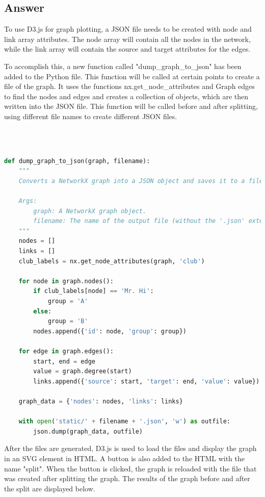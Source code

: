 \documentclass[12pt]{article}
\begin{document}
\subsection*{Answer}
To use D3.js for graph plotting, a JSON file needs to be created with node and link array attributes. The node array will contain all the nodes in the network, while the link array will contain the source and target attributes for the edges.

To accomplish this, a new function called "dump\_graph\_to\_json" has been added to the Python file. This function will be called at certain points to create a file of the graph. It uses the functions nx.get\_node\_attributes and Graph edges to find the nodes and edges and creates a collection of objects, which are then written into the JSON file. This function will be called before and after splitting, using different file names to create different JSON files.

\\

\begin{lstlisting}[language=Python, caption=A function that generates a JSON representation of the graph.]

def dump_graph_to_json(graph, filename):
    """
    Converts a NetworkX graph into a JSON object and saves it to a file.

    Args:
        graph: A NetworkX graph object.
        filename: The name of the output file (without the '.json' extension).
    """
    nodes = []
    links = []
    club_labels = nx.get_node_attributes(graph, 'club')

    for node in graph.nodes():
        if club_labels[node] == 'Mr. Hi':
            group = 'A'
        else:
            group = 'B'
        nodes.append({'id': node, 'group': group})

    for edge in graph.edges():
        start, end = edge
        value = graph.degree(start)  
        links.append({'source': start, 'target': end, 'value': value})

    graph_data = {'nodes': nodes, 'links': links}

    with open('static/' + filename + '.json', 'w') as outfile:
        json.dump(graph_data, outfile)
\end{lstlisting}

\clearpage

After the files are generated, D3.js is used to load the files and display the graph in an SVG element in HTML. A button is also added to the HTML with the name "split". When the button is clicked, the graph is reloaded with the file that was created after splitting the graph. The results of the graph before and after the split are displayed below.
\end{document}
